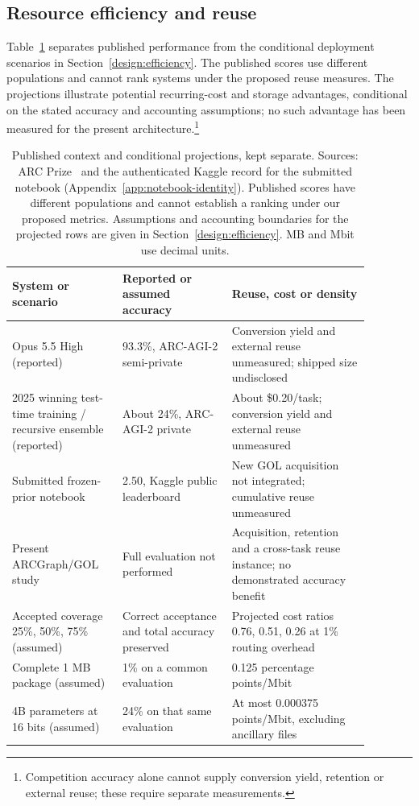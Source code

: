 \documentclass[11pt]{article}
\begin{document}
\subsection{Resource efficiency and reuse}\label{approach:leaderboard}
Table~\ref{tab:leaderboard-projections} separates published performance from the conditional deployment scenarios in Section~\ref{design:efficiency}. The published scores use different populations and cannot rank systems under the proposed reuse measures. The projections illustrate potential recurring-cost and storage advantages, conditional on the stated accuracy and accounting assumptions; no such advantage has been measured for the present architecture.\footnote{Competition accuracy alone cannot supply conversion yield, retention or external reuse; these require separate measurements.}

\begin{table}[htbp]
\centering\small
\begin{tabular}{p{0.27\linewidth}p{0.27\linewidth}p{0.34\linewidth}}
\hline
System or scenario & Reported or assumed accuracy & Reuse, cost or density \\
\hline
Opus 5.5 High (reported) & 93.3\%, ARC-AGI-2 semi-private & Conversion yield and external reuse unmeasured; shipped size undisclosed \\
2025 winning test-time training / recursive ensemble (reported) & About 24\%, ARC-AGI-2 private & About \$0.20/task; conversion yield and external reuse unmeasured \\
Submitted frozen-prior notebook & 2.50, Kaggle public leaderboard & New GOL acquisition not integrated; cumulative reuse unmeasured \\
Present ARCGraph/GOL study & Full evaluation not performed & Acquisition, retention and a cross-task reuse instance; no demonstrated accuracy benefit \\
\hline
Accepted coverage 25\%, 50\%, 75\% (assumed) & Correct acceptance and total accuracy preserved & Projected cost ratios 0.76, 0.51, 0.26 at 1\% routing overhead \\
Complete 1 MB package (assumed) & 1\% on a common evaluation & 0.125 percentage points/Mbit \\
4B parameters at 16 bits (assumed) & 24\% on that same evaluation & At most 0.000375 points/Mbit, excluding ancillary files \\
\hline
\end{tabular}
\caption{Published context and conditional projections, kept separate. Sources: ARC Prize~\cite{opus55results,arc2025competition,arcresults2025} and the authenticated Kaggle record for the submitted notebook (Appendix~\ref{app:notebook-identity}). Published scores have different populations and cannot establish a ranking under our proposed metrics. Assumptions and accounting boundaries for the projected rows are given in Section~\ref{design:efficiency}. MB and Mbit use decimal units.}
\label{tab:leaderboard-projections}
\end{table}
\end{document}
